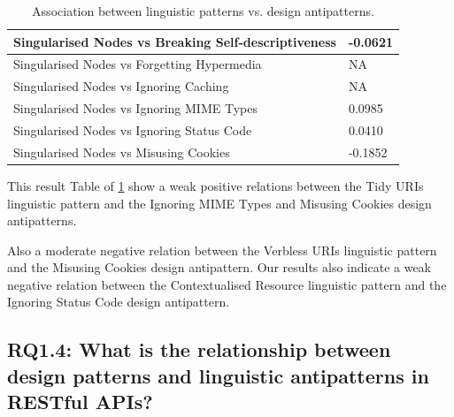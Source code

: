 \documentclass[a4paper,12pt]{article}
\begin{document}
\begin{table}[htb!]
\begin{tabular}{|p{90mm}|p{50mm}|}
Singularised Nodes vs Breaking Self-descriptiveness & -0.0621
\\ \hline 
Singularised Nodes vs Forgetting Hypermedia & NA
\\ \hline 
Singularised Nodes vs Ignoring Caching & NA
\\ \hline 
Singularised Nodes vs Ignoring MIME Types & 0.0985
\\ \hline 
Singularised Nodes vs Ignoring Status Code & 0.0410
\\ \hline 
Singularised Nodes vs Misusing Cookies & -0.1852
\\ \hline
    \end{tabular}
    \caption{Association between linguistic patterns vs. design antipatterns.}
    \label{tab:Linguistic patterns vs design antipatterns}
\end{table}

\clearpage

This result Table of \ref{tab:Linguistic patterns vs design antipatterns} show a weak positive relations between the Tidy URIs linguistic pattern and the  Ignoring MIME Types and Misusing Cookies design antipatterns. 

Also a moderate negative relation between the  Verbless URIs linguistic pattern and the  Misusing Cookies design antipattern. Our results also indicate a weak negative relation between the  Contextualised Resource linguistic pattern and the  Ignoring Status Code design antipattern.

\subsection{\textbf{RQ1.4:} What is the relationship between design patterns and linguistic antipatterns in RESTful APIs?}
\end{document}
